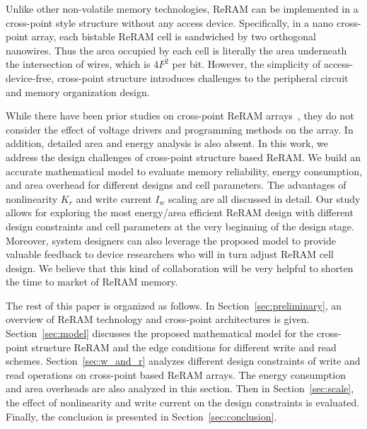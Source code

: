 Unlike other non-volatile memory technologies, ReRAM can be implemented in
a cross-point style structure without any access device. Specifically, in
a nano cross-point array, each bistable ReRAM cell is sandwiched by two
orthogonal nanowires. Thus the area occupied by each cell is literally the
area underneath the intersection of wires, which is $4F^2$ per bit.
However, the simplicity of access-device-free, cross-point structure
introduces challenges to the peripheral circuit and memory organization
design.

While there have been prior studies on cross-point ReRAM
arrays~\cite{crossbar_NANO2002_Ziegler,crossbar_NANO08_Flocke,crossbar_TED_2010,crossbar_NANO2003_Ziegler},
they do not consider the effect of voltage drivers and programming methods
on the array. In addition, detailed area and energy analysis is also
absent. In this work, we address the design challenges of cross-point
structure based ReRAM. We build an accurate mathematical model to evaluate
memory reliability, energy consumption, and area overhead for different
designs and cell parameters. The advantages of nonlinearity $K_r$ and
write current $I_w$ scaling are all discussed in detail. Our study allows
for exploring the most energy/area efficient ReRAM design with different
design constraints and cell parameters at the very beginning of the design
stage. Moreover, system designers can also leverage the proposed
model to provide valuable feedback to device researchers who will in turn
adjust ReRAM cell design. We believe that this kind of collaboration will
be very helpful to shorten the time to market of ReRAM memory.

The rest of this paper is organized as follows. In
Section~\ref{sec:preliminary}, an overview of ReRAM technology and
cross-point architectures is given. Section~\ref{sec:model} discusses
the proposed mathematical model  for the cross-point structure ReRAM and the
edge conditions for different write and read schemes.
Section~\ref{sec:w_and_r} analyzes different design constraints of write
and read operations on cross-point based ReRAM arrays. The energy
consumption and area overheads are also analyzed in this section. Then in
Section~\ref{sec:scale}, the effect of nonlinearity and write current on
the design constraints is evaluated. Finally, the conclusion is presented
in Section~\ref{sec:conclusion}.
